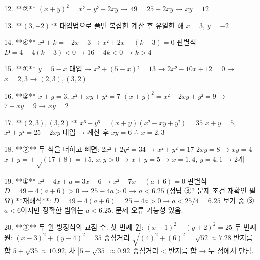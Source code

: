 \documentclass[fleqn]{article}
\begin{document}
12. **②**  
    \( (x+y)^2 =x² + y² +2xy \) → \( 49=25+2xy \) → \( xy=12 \)

13. **\( (3, -2) \)**  
    대입법으로 풀면 복잡한 계산 후 유일한 해 \( x=3 \), \( y=-2 \)

14. **④**  
    \( x² +k =-2x +3 \) → \( x² +2x +(k-3)=0 \)  
    판별식 \( D=4 -4(k-3)<0 \) → \( 16-4k<0 \) → \( k>4 \)

15. **①**  
    \( y=5-x \) 대입 → \( x² + (5-x)²=13 \) → \( 2x² -10x +12=0 \)  
    → \( x=2,3 \) → \( (2,3), (3,2) \)

16. **②**  
    \( x+y=3 \), \( x² +xy +y²=7 \)  
    \( (x+y)^2 =x² +2xy +y²=9 \) → \( 7 +xy=9 \) → \( xy=2 \)

17. **\( (2,3), (3,2) \)**  
    \( x³ + y³ = (x+y)(x² -xy +y²) =35 \)  
    \( x+y=5 \), \( x² +y²=25 -2xy \) 대입 → 계산 후 \( xy=6 \)  
    ∴ \( x=2,3 \)

18. **②**  
    두 식을 더하고 빼면:  
    \( 2x² +2y²=34 \) → \( x² +y²=17 \)  
    \( 2xy=8 \) → \( xy=4 \)  
    \( x+y=±√(17+8)=±5 \), \( x,y >0 \) → \( x+y=5 \)  
    → \( x=1,4 \), \( y=4,1 \) → 2개

19. **①**  
    \( x² -4x +a =3x -6 \) → \( x² -7x +(a+6)=0 \)  
    판별식 \( D=49 -4(a+6)>0 \) → \( 25-4a>0 \) → \( a<6.25 \)  
    (정답 ③? 문제 조건 재확인 필요)  
    **재해석**:  
    \( D=49 -4(a+6)=25-4a >0 → a<25/4=6.25 \)  
    보기 중 ③ \( a<6 \)이지만 정확한 범위는 \( a<6.25 \). 문제 오류 가능성 있음.

20. **③**  
    두 원 방정식의 교점 수.  
    첫 번째 원: \( (x+1)^2 + (y+2)^2=25 \)  
    두 번째 원: \( (x-3)^2 + (y-4)^2=35 \)  
    중심거리 \( \sqrt{(4)^2 + (6)^2}=\sqrt{52} ≈7.28 \)  
    반지름 합 \( 5+\sqrt{35}≈10.92 \), 차 \( |5-\sqrt{35}|≈0.92 \)  
    중심거리 < 반지름 합 → 두 점에서 만남.      
    
\end{document}
